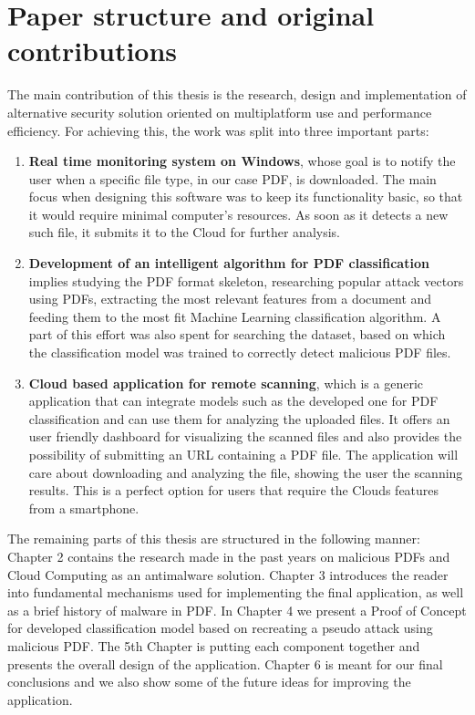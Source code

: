 \section{Paper structure and original contributions}
\label{section:structure}
The main contribution of this thesis is the research, design and implementation of alternative security solution oriented on multiplatform use and performance efficiency. For achieving this, the work was split into three important parts:
\begin{enumerate}
    \item \textbf{Real time monitoring system on Windows}, whose goal is to notify the user when a specific file type, in our case PDF, is downloaded. The main focus when designing this software was to keep its functionality basic, so that it would require minimal computer's resources. As soon as it detects a new such file, it submits it to the Cloud for further analysis.
    \item \textbf{Development of an intelligent algorithm for PDF classification} implies studying the PDF format skeleton, researching popular attack vectors using PDFs, extracting the most relevant features from a document and feeding them to the most fit Machine Learning classification algorithm. A part of this effort was also spent for searching the dataset, based on which the classification model was trained to correctly detect malicious PDF files.
    \item \textbf{Cloud based application for remote scanning}, which is a generic application that can integrate models such as the developed one for PDF classification and can use them for analyzing the uploaded files. It offers an user friendly dashboard for visualizing the scanned files and also provides the possibility of submitting an URL containing a PDF file. The application will care about downloading and analyzing the file, showing the user the scanning results. This is a perfect option for users that require the Clouds features from a smartphone.
\end{enumerate}

The remaining parts of this thesis are structured in the following manner: Chapter 2 contains the research made in the past years on malicious PDFs and Cloud Computing as an antimalware solution. Chapter 3 introduces the reader into fundamental mechanisms used for implementing the final application, as well as a brief history of malware in PDF. In Chapter 4 we present a Proof of Concept for developed classification model based on recreating a pseudo attack using malicious PDF. The 5th Chapter is putting each component together and presents the overall design of the application. Chapter 6 is meant for our final conclusions and we also show some of the future ideas for improving the application.

